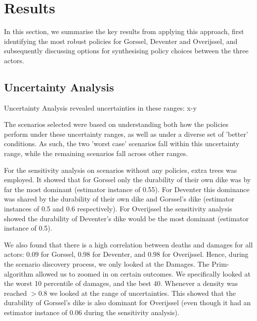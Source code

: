 \section{Results}
\label{s:results}

In this section, we summarise the key results from applying this approach, first identifying the most robust policies for Gorssel, Deventer and Overijssel, and subsequently discussing options for synthesising policy choices between the three actors. 


\subsection{Uncertainty Analysis}
Uncertainty Analysis revealed uncertainties in these ranges: x-y

The scenarios selected were based on understanding both how the policies perform under these uncertainty ranges, as well as under a diverse set of 'better' conditions. As such, the two 'worst case' scenarios fall within this uncertainty range, while the remaining scenarios fall across other ranges.


For the sensitivity analysis on scenarios without any policies, extra trees was employed. It showed that for Gorssel only the durability of their own dike was by far the most dominant (estimator instance of 0.55). For Deventer this dominance was shared by the durability of their own dike and Gorssel's dike (estimator instances of 0.5 and 0.6 respectively). For Overijssel the sensitivity analysis showed the durability of Deventer's dike would be the most dominant (estimator instance of 0.5).

We also found that there is a high correlation between deaths and damages for all actors: $0.09$ for Gorssel, $0.98$ for Deventer, and $0.98$ for Overijssel. Hence, during the scenario discovery process, we only looked at the Damages. The Prim-algorithm allowed us to zoomed in on certain outcomes. We specifically looked at the worst 10 percentile of damages, and the best 40. Whenever a density was reached $>0.8$ we looked at the range of uncertainties. This showed that the durability of Gorssel's dike is also dominant for Overijssel (even though it had an estimator instance of 0.06 during the sensitivity analysis).

